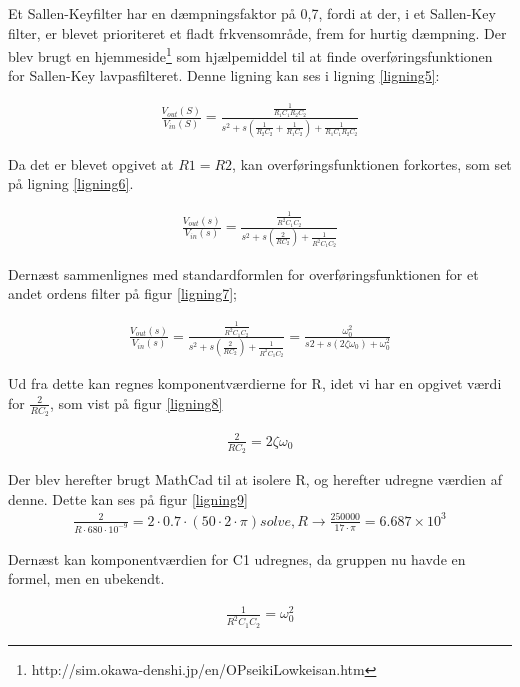 Et Sallen-Keyfilter har en dæmpningsfaktor på 0,7, fordi at der, i et Sallen-Key filter, er blevet prioriteret et fladt frkvensområde, frem for hurtig dæmpning. Der blev brugt en hjemmeside\footnote{http://sim.okawa-denshi.jp/en/OPseikiLowkeisan.htm} som hjælpemiddel til at finde overføringsfunktionen for Sallen-Key lavpasfilteret. Denne ligning kan ses i ligning \ref{ligning5}:


\begin{align}
	\frac{V_{out}(S)}{V_{in}(S)}=\frac{\frac{1}{R_1C_1R_2C_2}}{s^2+s(\frac{1}{R_2C_2}+\frac{1}{R_1C_2})+\frac{1}{R_1C_1R_2C_2}}
	\label{ligning5}
\end{align}

Da det er blevet opgivet at $R1=R2$, kan overføringsfunktionen forkortes, som set på ligning \ref{ligning6}.

\begin{align}
\frac{V_{out}(s)}{V_{in}(s)}=\frac{\frac{1}{R^2C_{1}C_{2}}}{s^2+s(\frac{2}{RC_{2}})+\frac{1}{R^2C_{1}C_{2}}}
\label{ligning6}
\end{align}

Dernæst sammenlignes med standardformlen for overføringsfunktionen for et andet ordens filter på figur \ref{ligning7};

\begin{align}
\frac{V_{out}(s)}{V_{in}(s)} = \frac{\frac{1}{R^{2}C_{1} C_{2}}}{s^2+s(\frac{2}{RC_{2}})+\frac{1}{R^{2}C_{1}C_{2}}} = \frac{\omega_{0}^{2}}{s{2}+s(2\zeta\omega_{0})+\omega_{0}^{2}}
\label{ligning7}
\end{align}

Ud fra dette kan regnes komponentværdierne for R, idet vi har en opgivet værdi for $\frac{2}{RC_{2}}$, som vist på figur \ref{ligning8}

\begin{align}
\frac{2}{RC_{2}}=2\zeta\omega_{0}
\label{ligning8}
\end{align}

Der blev herefter brugt MathCad til at isolere R, og herefter udregne værdien af denne. Dette kan ses på figur \ref{ligning9}
\begin{align}
\frac{2}{R\cdot680\cdot10^{-9}}=2\cdot0.7\cdot(50\cdot2\cdot\pi) solve, R \to \frac{250000}{17\cdot\pi}=6.687\times 10^3
\label{ligning9}
\end{align}

Dernæst kan komponentværdien for C1 udregnes, da gruppen nu havde en formel, men en ubekendt.


\begin{align*}
\frac{1}{R^2C_{1}C_{2}}=\omega_{0}^2
\label{ligning10}
\end{align*}	

